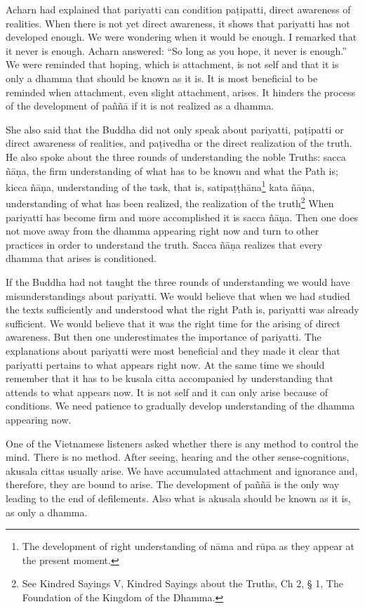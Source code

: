 {{{Acharn had explained that pariyatti can
condition paṭipatti, direct awareness of realities. When there is not
yet direct awareness, it shows that pariyatti has not developed enough.
We were wondering when it would be enough. I remarked that it never is
enough. Acharn answered: ``So long as you hope, it never is enough.'' We
were reminded that hoping, which is attachment, is not self and that it
is only a dhamma that should be known as it is. It is most beneficial to
be reminded when attachment, even slight attachment, arises. It hinders
the process of the development of paññā if it is not realized as a
dhamma. 

She also said that the Buddha did not
only speak about pariyatti, paṭipatti or direct awareness of realities,
and paṭivedha or the direct realization of the truth. He also spoke
about the three rounds of understanding the noble Truths: sacca ñāṇa,
the firm understanding of what has to be known and what the Path is;
kicca ñāṇa, understanding of the task, that is,
satipaṭṭhāna\footnote{The development of right
understanding of nāma and rūpa as they appear at the present moment.}
kata ñāṇa, understanding of what has been realized, the realization of
the truth\footnote{See Kindred Sayings V, Kindred
Sayings about the Truths, Ch 2, § 1, The Foundation of the Kingdom of
the Dhamma.}
When pariyatti has become firm and more accomplished it is sacca ñāṇa.
Then one does not move away from the dhamma appearing right now and turn
to other practices in order to understand the truth. Sacca ñāṇa realizes
that every dhamma that arises is conditioned. 

If the Buddha had not taught the three
rounds of understanding we would have misunderstandings about pariyatti.
We would believe that when we had studied the texts sufficiently and
understood what the right Path is, pariyatti was already sufficient. We
would believe that it was the right time for the arising of direct
awareness. But then one underestimates the importance of pariyatti. The
explanations about pariyatti were most beneficial and they made it clear
that pariyatti pertains to what appears right now. At the same time we
should remember that it has to be kusala citta accompanied by
understanding that attends to what appears now. It is not self and it
can only arise because of conditions. We need patience to gradually
develop understanding of the dhamma appearing now. 

One of the Vietnamese listeners asked
whether there is any method to control the mind. There is no method.
After seeing, hearing and the other sense-cognitions, akusala cittas
usually arise. We have accumulated attachment and ignorance and,
therefore, they are bound to arise. The development of paññā is the only
way leading to the end of defilements. Also what is akusala should be
known as it is, as only a dhamma. 

}}}

